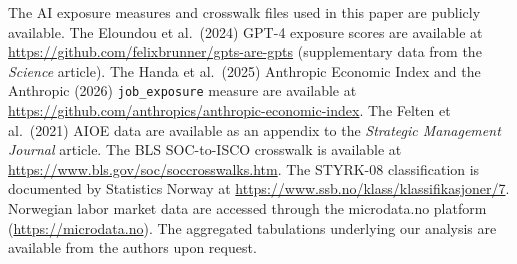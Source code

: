 The AI exposure measures and crosswalk files used in this paper are publicly available. The Eloundou et al.\ (2024) GPT-4 exposure scores are available at \url{https://github.com/felixbrunner/gpts-are-gpts} (supplementary data from the \textit{Science} article). The Handa et al.\ (2025) Anthropic Economic Index and the Anthropic (2026) \texttt{job\_exposure} measure are available at \url{https://github.com/anthropics/anthropic-economic-index}. The Felten et al.\ (2021) AIOE data are available as an appendix to the \textit{Strategic Management Journal} article. The BLS SOC-to-ISCO crosswalk is available at \url{https://www.bls.gov/soc/soccrosswalks.htm}. The STYRK-08 classification is documented by Statistics Norway at \url{https://www.ssb.no/klass/klassifikasjoner/7}. Norwegian labor market data are accessed through the microdata.no platform (\url{https://microdata.no}). The aggregated tabulations underlying our analysis are available from the authors upon request.



